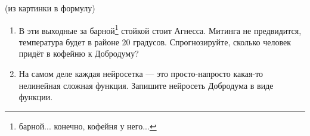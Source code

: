 \begin{problem}{(из картинки в формулу)}
\begin{center}
\end{center}

\begin{enumerate}
\item В эти выходные за барной\footnote{барной... конечно, кофейня у него...} стойкой стоит Агнесса. Митинга не предвидится, температура будет в районе $20$ градусов. Спрогнозируйте, сколько человек придёт в кофейню к Добродуму? 

\item На самом деле каждая нейросетка --- это просто-напросто какая-то нелинейная сложная функция. Запишите нейросеть Добродума в виде функции.
\end{enumerate}
\end{problem}

